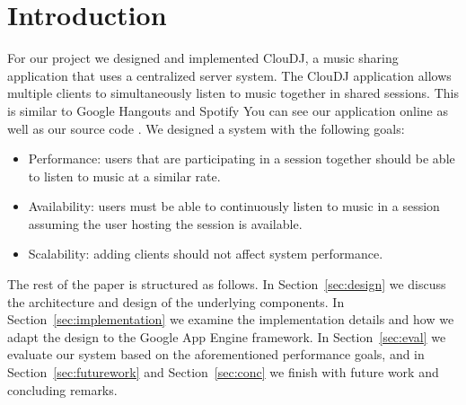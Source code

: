 \section{Introduction}
\label{sec:intro}
For our project we designed and implemented ClouDJ, 
a music sharing application that uses a centralized 
server system. The ClouDJ application allows multiple 
clients to simultaneously listen to music together 
in shared sessions. This is similar to Google Hangouts 
\cite{googlehangouts} and Spotify \cite{spotify}
You can see our application online \cite{ourapp} as well as our source 
code \cite{ourcode}.
We designed a system with the following goals:
\begin{itemize}
  \item Performance: users that are participating in 
    a session together should be able to listen to music at a similar rate.
  \item Availability: users must be able to continuously 
    listen to music in a session assuming the user hosting 
    the session is available.
  \item Scalability: adding clients should not affect system performance.
\end{itemize}
The rest of the paper is structured as follows. In Section~\ref{sec:design}
we discuss the architecture and design of the underlying components. 
In Section~\ref{sec:implementation} we examine the implementation details
and how we adapt the design to the Google App Engine framework. In 
Section~\ref{sec:eval} we evaluate our system based on the aforementioned
performance goals, and in Section~\ref{sec:futurework} and Section~\ref{sec:conc}
we finish with future work and concluding remarks.
